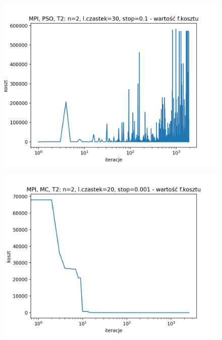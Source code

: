 \documentclass[11pt, a4paper, oneside]{article}
\begin{document}
\begin{figure}[H]
\centering
\begin{minipage}[b]{\dimexpr.5\textwidth-1em}
  \centering
  \includegraphics[width=1\linewidth]{grafiki2/MPI_PSO_T2/MPI_PSO_T2_koszt.png}
  \label{fig:pozycjeStartowe:PSO2}
\end{minipage} \hfill
\begin{minipage}[b]{\dimexpr.5\textwidth-1em}
  \centering
  \includegraphics[width=1\linewidth]{grafiki2/MPI_MC_T2/MPI_MC_T2_koszt.png}
  \label{fig:pozycjeStartowe:MC2}
\end{minipage}
\end{figure}
\end{document}
